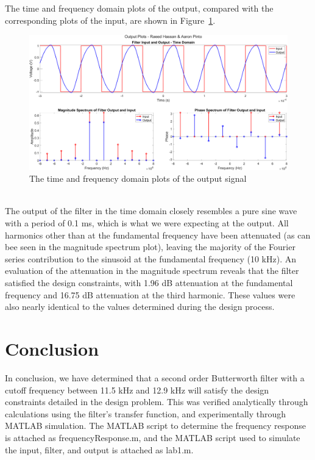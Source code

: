 \documentclass[12pt]{article}
\begin{document}
The time and frequency domain plots of the output, compared with the corresponding plots of the input, are shown in Figure~\ref{fig:output}. 
\begin{figure}[h!]
    \includegraphics[width=\textwidth]{output.png}
    \caption{\label{fig:output} The time and frequency domain plots of the output signal}
\end{figure} \\
The output of the filter in the time domain closely resembles a pure sine wave with a period of 0.1 ms, which is what we were expecting at the output. All harmonics other than at the fundamental frequency have been attenuated (as can bee seen in the magnitude spectrum plot), leaving the majority of the Fourier series contribution to the sinusoid at the fundamental frequency (10 kHz). An evaluation of the attenuation in the magnitude spectrum reveals that the filter satisfied the design constraints, with 1.96 dB attenuation at the fundamental frequency and 16.75 dB attenuation at the third harmonic. These values were also nearly identical to the values determined during the design process.

\clearpage
\section*{Conclusion}
In conclusion, we have determined that a second order Butterworth filter with a cutoff frequency between 11.5 kHz and 12.9 kHz will satisfy the design constraints detailed in the design problem. This was verified analytically through calculations using the filter's transfer function, and experimentally through MATLAB simulation. The MATLAB script to determine the frequency response is attached as frequencyResponse.m, and the MATLAB script used to simulate the input, filter, and output is attached as lab1.m.
\end{document}
